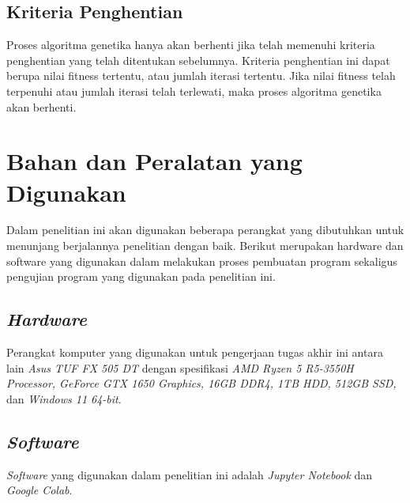   \subsection{Kriteria Penghentian}
  
  Proses algoritma genetika hanya akan berhenti jika telah memenuhi kriteria penghentian yang telah ditentukan sebelumnya. 
  Kriteria penghentian ini dapat berupa nilai fitness tertentu, atau jumlah iterasi tertentu. 
  Jika nilai fitness telah terpenuhi atau jumlah iterasi telah terlewati, maka proses algoritma genetika akan berhenti.

\section{Bahan dan Peralatan yang Digunakan}
Dalam penelitian ini akan digunakan beberapa perangkat yang dibutuhkan untuk menunjang berjalannya penelitian dengan baik.
Berikut merupakan hardware dan software yang digunakan dalam melakukan proses pembuatan program sekaligus pengujian program yang digunakan pada penelitian ini.
\subsection{\emph{Hardware}}
Perangkat komputer yang digunakan untuk pengerjaan tugas akhir ini antara lain \emph{Asus TUF FX 505 DT} dengan spesifikasi \emph{AMD Ryzen 5 R5-3550H Processor, GeForce GTX 1650 Graphics, 16GB DDR4, 1TB HDD, 512GB SSD,} dan \emph{Windows 11 64-bit}.
\subsection{\emph{Software}}
\emph{Software} yang digunakan dalam penelitian ini adalah \emph{Jupyter Notebook} dan \emph{Google Colab}.

